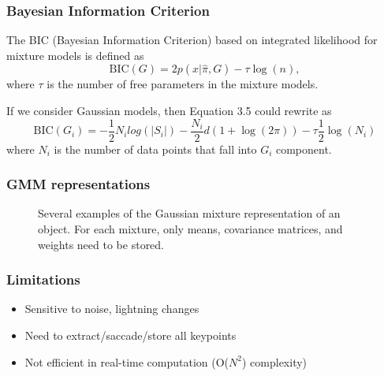 \documentclass{beamer}
\begin{document}


\begin{frame}
\frametitle{Bayesian Information Criterion}
The BIC (Bayesian Information Criterion) based on integrated likelihood for mixture models is defined as
\begin{equation}
\mathrm{BIC}(G) = 2p(x|\hat{\pi},G)- \tau \log(n),
\end{equation}
where $\tau$ is the number of free parameters in the mixture models.

If we consider Gaussian models, then Equation 3.5 could rewrite as 
\begin{equation}
\mathrm{BIC}(G_{i}) = -\frac{1}{2} N_{i} log(\vert S_{i}\vert) - \frac{N_i}{2} d(1 + \log(2\pi)) - \tau \frac{1}{2} \log(N_{i})
\end{equation}
where $N_i$ is the number of data points that fall into $G_i$ component.

\end{frame}



\begin{frame}
\frametitle{GMM representations}
\begin{figure}
  \centering

  
  \caption{Several examples of the Gaussian mixture representation of an object. For each mixture, only means, covariance matrices, and weights need to be stored.}
  \label{fig:3.3}
\end{figure}   
\end{frame}


\begin{frame}

\frametitle{Limitations}
\begin{itemize}
\item \alert<+>{Sensitive to noise, lightning changes}
\item Need to extract/saccade/store all keypoints
\item Not efficient in real-time computation (O($N^2$) complexity) 
\end{itemize}
\end{frame}
\end{document}
